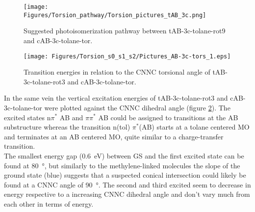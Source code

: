 %
%
%
\begin{figure}[H]
    \centering
    \texttt{[image: Figures/Torsion\_pathway/Torsion\_pictures\_tAB\_3c.png]}
    \caption{Suggested photoisomerization pathway between tAB-3c-tolane-rot9 and cAB-3c-tolane-tor.}
    \label{fig:tors_tAB-cAB-3c-pathway}
\end{figure}
%
%
\begin{figure}[H]
    \centering
    \texttt{[image: Figures/Torsion\_s0\_s1\_s2/Pictures\_AB-3c-tors\_1.eps]}
    \caption{Transition energies in relation to the CNNC torsional angle of tAB-3c-tolane-rot3 and cAB-3c-tolane-tor.}
    \label{fig:tors-tAB-cAB-3c}
\end{figure}
%
In the same vein the vertical excitation energies of tAB-3c-tolane-rot3 and cAB-3c-tolane-tor were plotted against the CNNC dihedral angle (figure \ref{fig:tors-tAB-cAB-3c}). The excited states n$\pi^{*}$ AB and $\pi\pi^{*}$ AB could be assigned to transitions at the AB substructure whereas the transition n(tol) $\pi^{*}$(AB) starts at a tolane centered MO and terminates at an AB centered MO, quite similar to a charge-transfer transition. \\
The smallest energy gap (\SI{0.6}{\eV}) between GS and the first excited state can be found at \SI{80}{\degree}, but similarly to the methylene-linked molecules the slope of the ground state (blue) suggests that a suspected conical intersection could likely be found at a CNNC angle of \SI{90}{\degree}. The second and third excited seem to decrease in energy respective to a increasing CNNC dihedral angle and don't vary much from each other in terms of energy.


